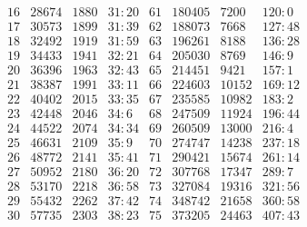 \documentclass[11pt,a4paper]{article}
\begin{document}
\[
\begin{array}{r|r|r|r||r|r|r|r}
16 & 28674 & 1880 & 31{:}20 & 61 & 180405 & 7200 & 120{:}0 \\
17 & 30573 & 1899 & 31{:}39 & 62 & 188073 & 7668 & 127{:}48 \\
18 & 32492 & 1919 & 31{:}59 & 63 & 196261 & 8188 & 136{:}28 \\
19 & 34433 & 1941 & 32{:}21 & 64 & 205030 & 8769 & 146{:}9 \\
20 & 36396 & 1963 & 32{:}43 & 65 & 214451 & 9421 & 157{:}1 \\
\hline
21 & 38387 & 1991 & 33{:}11 & 66 & 224603 & 10152 & 169{:}12 \\
22 & 40402 & 2015 & 33{:}35 & 67 & 235585 & 10982 & 183{:}2 \\
23 & 42448 & 2046 & 34{:}6 & 68 & 247509 & 11924 & 196{:}44 \\
24 & 44522 & 2074 & 34{:}34 & 69 & 260509 & 13000 & 216{:}4 \\
25 & 46631 & 2109 & 35{:}9 & 70 & 274747 & 14238 & 237{:}18 \\
\hline
26 & 48772 & 2141 & 35{:}41 & 71 & 290421 & 15674 & 261{:}14 \\
27 & 50952 & 2180 & 36{:}20 & 72 & 307768 & 17347 & 289{:}7 \\
28 & 53170 & 2218 & 36{:}58 & 73 & 327084 & 19316 & 321{:}56 \\
29 & 55432 & 2262 & 37{:}42 & 74 & 348742 & 21658 & 360{:}58 \\
30 & 57735 & 2303 & 38{:}23 & 75 & 373205 & 24463 & 407{:}43 \\
\end{array}
\]
\end{document}
